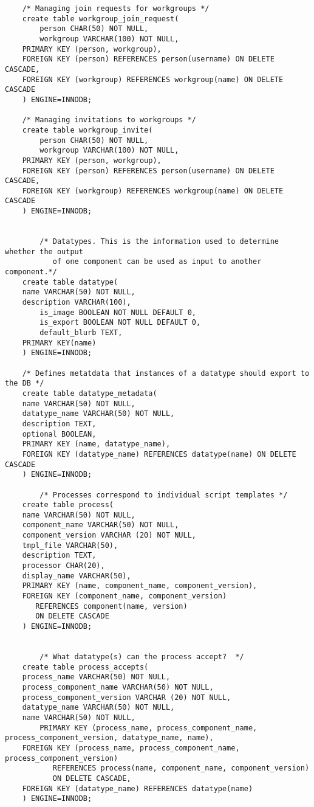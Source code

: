 \begin{tiny}
\begin{verbatim}
	/* Managing join requests for workgroups */
	create table workgroup_join_request(
        person CHAR(50) NOT NULL,
        workgroup VARCHAR(100) NOT NULL,
	PRIMARY KEY (person, workgroup),
	FOREIGN KEY (person) REFERENCES person(username) ON DELETE CASCADE,
	FOREIGN KEY (workgroup) REFERENCES workgroup(name) ON DELETE CASCADE
	) ENGINE=INNODB;
	
	/* Managing invitations to workgroups */
	create table workgroup_invite(
        person CHAR(50) NOT NULL,
        workgroup VARCHAR(100) NOT NULL,
	PRIMARY KEY (person, workgroup),
	FOREIGN KEY (person) REFERENCES person(username) ON DELETE CASCADE,
	FOREIGN KEY (workgroup) REFERENCES workgroup(name) ON DELETE CASCADE
	) ENGINE=INNODB;
	

        /* Datatypes. This is the information used to determine whether the output  
           of one component can be used as input to another component.*/
 	create table datatype(
 	name VARCHAR(50) NOT NULL,
 	description VARCHAR(100),
        is_image BOOLEAN NOT NULL DEFAULT 0,
        is_export BOOLEAN NOT NULL DEFAULT 0,
        default_blurb TEXT,
	PRIMARY KEY(name)
 	) ENGINE=INNODB;

	/* Defines metatdata that instances of a datatype should export to the DB */
	create table datatype_metadata(
	name VARCHAR(50) NOT NULL,
	datatype_name VARCHAR(50) NOT NULL,
	description TEXT,
	optional BOOLEAN,
	PRIMARY KEY (name, datatype_name),
	FOREIGN KEY (datatype_name) REFERENCES datatype(name) ON DELETE CASCADE
	) ENGINE=INNODB;

        /* Processes correspond to individual script templates */
 	create table process(
 	name VARCHAR(50) NOT NULL,
 	component_name VARCHAR(50) NOT NULL,
	component_version VARCHAR (20) NOT NULL,
 	tmpl_file VARCHAR(50),
 	description TEXT,
	processor CHAR(20),
	display_name VARCHAR(50),
	PRIMARY KEY (name, component_name, component_version),
	FOREIGN KEY (component_name, component_version)
	   REFERENCES component(name, version)
	   ON DELETE CASCADE
 	) ENGINE=INNODB;


        /* What datatype(s) can the process accept?  */
 	create table process_accepts(
  	process_name VARCHAR(50) NOT NULL,
	process_component_name VARCHAR(50) NOT NULL,
	process_component_version VARCHAR (20) NOT NULL,
 	datatype_name VARCHAR(50) NOT NULL,
	name VARCHAR(50) NOT NULL,
        PRIMARY KEY (process_name, process_component_name, process_component_version, datatype_name, name),
	FOREIGN KEY (process_name, process_component_name, process_component_version) 
           REFERENCES process(name, component_name, component_version) 
           ON DELETE CASCADE,
	FOREIGN KEY (datatype_name) REFERENCES datatype(name)
 	) ENGINE=INNODB;


\end{verbatim}
\end{tiny}
